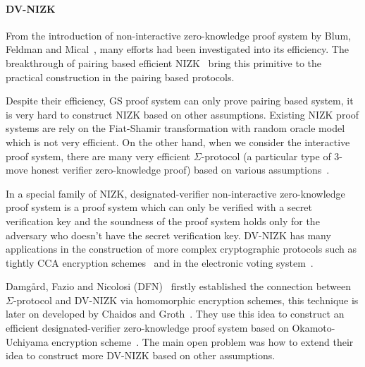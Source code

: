 \paragraph{DV-NIZK}
From the introduction of non-interactive zero-knowledge proof system by Blum, Feldman and Mical~\cite{DBLP:conf/stoc/BlumFM88},
many efforts had been investigated into its efficiency.
The breakthrough of pairing based efficient NIZK~\cite{DBLP:conf/eurocrypt/GrothS08} bring this primitive to the practical construction in the pairing based protocols.

Despite their efficiency, GS proof system can only prove pairing based system, it is very hard to construct NIZK based on other assumptions.
Existing NIZK proof systems are rely on the Fiat-Shamir transformation with random oracle model which is not very efficient.
On the other hand, when we consider the interactive proof system,
there are many very efficient $\Sigma$-protocol (a particular type of 3-move honest verifier zero-knowledge proof) based on various assumptions~\cite{DBLP:journals/iacr/BaumDOP16}\cite{DBLP:conf/crypto/BaumDLN16}.

In a special family of NIZK, designated-verifier non-interactive zero-knowledge proof system is a proof system which can only be verified with a secret verification key
and the soundness of the proof system holds only for the adversary who doesn't have the secret verification key.
DV-NIZK has many applications in the construction of more complex cryptographic protocols such as
tightly CCA encryption schemes~\cite{DBLP:conf/eurocrypt/GayHKW16} and in the electronic voting system~\cite{DBLP:conf/pkc/ChaidosG15}.


Damg\r{a}rd, Fazio and Nicolosi (DFN)~\cite{DBLP:conf/tcc/DamgardFN06} firstly established the connection between $\Sigma$-protocol and DV-NIZK via homomorphic encryption schemes,
this technique is later on developed by Chaidos and Groth~\cite{DBLP:conf/pkc/ChaidosG15}.
They use this idea to construct an efficient designated-verifier zero-knowledge proof system based on Okamoto-Uchiyama encryption scheme~\cite{DBLP:conf/eurocrypt/OkamotoU98}.
The main open problem was how to extend their idea to construct more DV-NIZK based on other assumptions.

